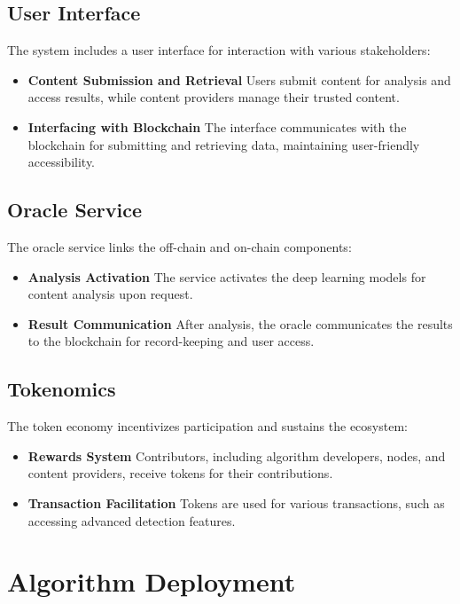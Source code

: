 \documentclass{article}
\begin{document}
\subsection{User Interface}

The system includes a user interface for interaction with various stakeholders:

\begin{itemize}
    \item \textbf{Content Submission and Retrieval} Users submit content for analysis and access results, while content providers manage their trusted content.
    \item \textbf{Interfacing with Blockchain} The interface communicates with the blockchain for submitting and retrieving data, maintaining user-friendly accessibility.
\end{itemize}

\subsection{Oracle Service}

The oracle service links the off-chain and on-chain components:

\begin{itemize}
    \item \textbf{Analysis Activation} The service activates the deep learning models for content analysis upon request.
    \item \textbf{Result Communication} After analysis, the oracle communicates the results to the blockchain for record-keeping and user access.
\end{itemize}

\subsection{Tokenomics}

The token economy incentivizes participation and sustains the ecosystem:

\begin{itemize}
    \item \textbf{Rewards System} Contributors, including algorithm developers, nodes, and content providers, receive tokens for their contributions.
    \item \textbf{Transaction Facilitation} Tokens are used for various transactions, such as accessing advanced detection features.
\end{itemize}


\section{Algorithm Deployment}
\end{document}
